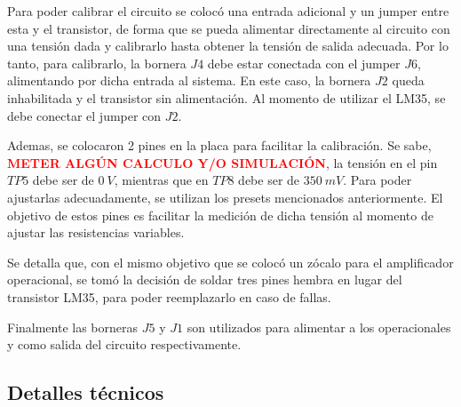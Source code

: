 \documentclass[a4paper]{article}
\begin{document}
Para poder calibrar el circuito se colocó una entrada adicional y un jumper entre esta y el transistor, de forma que se pueda alimentar directamente al circuito con una tensión dada y calibrarlo hasta obtener la tensión de salida adecuada. Por lo tanto, para calibrarlo, la bornera $J4$ debe estar conectada con el jumper $J6$, alimentando por dicha entrada al sistema. En este caso, la bornera $J2$ queda inhabilitada y el transistor sin alimentación.
Al momento de utilizar el LM35, se debe conectar el jumper con $J2$.

Ademas, se colocaron 2 pines en la placa para facilitar la calibración. Se sabe, \textcolor{red}{\textbf{METER ALGÚN CALCULO Y/O SIMULACIÓN}}, la tensión en el pin $TP5$ debe ser de $0 \ V$, mientras que en $TP8$ debe ser de $350 \ mV$. Para poder ajustarlas adecuadamente, se utilizan los presets mencionados anteriormente. El objetivo de estos pines es facilitar la medición de dicha tensión al momento de ajustar las resistencias variables.

Se detalla que, con el mismo objetivo que se colocó un zócalo para el amplificador operacional, se tomó la decisión de soldar tres pines hembra en lugar del transistor LM35, para poder reemplazarlo en caso de fallas.

Finalmente las borneras $J5$ y $J1$ son utilizados para alimentar a los operacionales y como salida del circuito respectivamente.

\subsection{Detalles técnicos}

\end{document}
